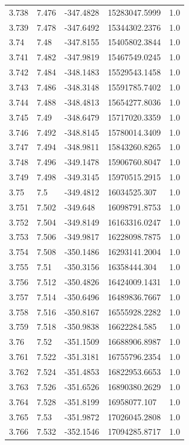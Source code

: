 \begin{tabular}{lllll}
3.738 & 7.476 & -347.4828 & 15283047.5999 & 1.0 \\
3.739 & 7.478 & -347.6492 & 15344302.2376 & 1.0 \\
3.74 & 7.48 & -347.8155 & 15405802.3844 & 1.0 \\
3.741 & 7.482 & -347.9819 & 15467549.0245 & 1.0 \\
3.742 & 7.484 & -348.1483 & 15529543.1458 & 1.0 \\
3.743 & 7.486 & -348.3148 & 15591785.7402 & 1.0 \\
3.744 & 7.488 & -348.4813 & 15654277.8036 & 1.0 \\
3.745 & 7.49 & -348.6479 & 15717020.3359 & 1.0 \\
3.746 & 7.492 & -348.8145 & 15780014.3409 & 1.0 \\
3.747 & 7.494 & -348.9811 & 15843260.8265 & 1.0 \\
3.748 & 7.496 & -349.1478 & 15906760.8047 & 1.0 \\
3.749 & 7.498 & -349.3145 & 15970515.2915 & 1.0 \\
3.75 & 7.5 & -349.4812 & 16034525.307 & 1.0 \\
3.751 & 7.502 & -349.648 & 16098791.8753 & 1.0 \\
3.752 & 7.504 & -349.8149 & 16163316.0247 & 1.0 \\
3.753 & 7.506 & -349.9817 & 16228098.7875 & 1.0 \\
3.754 & 7.508 & -350.1486 & 16293141.2004 & 1.0 \\
3.755 & 7.51 & -350.3156 & 16358444.304 & 1.0 \\
3.756 & 7.512 & -350.4826 & 16424009.1431 & 1.0 \\
3.757 & 7.514 & -350.6496 & 16489836.7667 & 1.0 \\
3.758 & 7.516 & -350.8167 & 16555928.2282 & 1.0 \\
3.759 & 7.518 & -350.9838 & 16622284.585 & 1.0 \\
3.76 & 7.52 & -351.1509 & 16688906.8987 & 1.0 \\
3.761 & 7.522 & -351.3181 & 16755796.2354 & 1.0 \\
3.762 & 7.524 & -351.4853 & 16822953.6653 & 1.0 \\
3.763 & 7.526 & -351.6526 & 16890380.2629 & 1.0 \\
3.764 & 7.528 & -351.8199 & 16958077.107 & 1.0 \\
3.765 & 7.53 & -351.9872 & 17026045.2808 & 1.0 \\
3.766 & 7.532 & -352.1546 & 17094285.8717 & 1.0 \\

\end{tabular}

